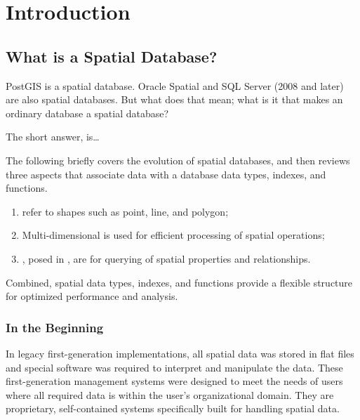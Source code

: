 \documentclass[a4paper,11pt,english]{sphinxmanual}
\begin{document}
\chapter{Introduction}
\label{\detokenize{introduction:introduction}}\label{\detokenize{introduction:id1}}\label{\detokenize{introduction::doc}}

\section{What is a Spatial Database?}
\label{\detokenize{introduction:what-is-a-spatial-database}}
PostGIS is a spatial database. Oracle Spatial and SQL Server (2008 and later) are also spatial databases. But what does that mean; what is it that makes an ordinary database a spatial database?

The short answer, is…


The following briefly covers the evolution of spatial databases, and then reviews three aspects that associate  data with a database \textendash{} data types, indexes, and functions.
\begin{enumerate}
\def\theenumi{\arabic{enumi}}
\def\labelenumi{\theenumi .}
\makeatletter\def\p@enumii{\p@enumi \theenumi .}\makeatother
\item {} 
 refer to shapes such as point, line, and polygon;

\item {} 
Multi-dimensional  is used for efficient processing of spatial operations;

\item {} 
, posed in {\hyperref[\detokenize{glossary:term-sql}]{}}, are for querying of spatial properties and relationships.

\end{enumerate}

Combined, spatial data types, indexes, and functions provide a flexible structure for optimized performance and analysis.


\subsection{In the Beginning}
\label{\detokenize{introduction:in-the-beginning}}
In legacy first-generation {\hyperref[\detokenize{glossary:term-gis}]{}} implementations, all spatial data was stored in flat files and special {\hyperref[\detokenize{glossary:term-gis}]{}}
software was required to interpret and manipulate the data. These first-generation management systems were designed to meet the needs of users where all required data is within the user’s organizational domain. They are proprietary, self-contained systems specifically built for handling spatial data.
\end{document}
